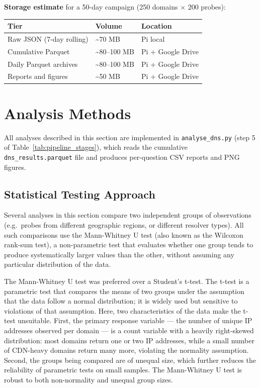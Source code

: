 \textbf{Storage estimate} for a 50-day campaign (250 domains $\times$ 200 probes):

\begin{table}[H]
\centering
\small
\begin{tabular}{l l l}
\toprule
\textbf{Tier} & \textbf{Volume} & \textbf{Location} \\
\midrule
Raw JSON (7-day rolling) & \textasciitilde{}70 MB & Pi local \\
Cumulative Parquet & \textasciitilde{}80--100 MB & Pi + Google Drive \\
Daily Parquet archives & \textasciitilde{}80--100 MB & Pi + Google Drive \\
Reports and figures & \textasciitilde{}50 MB & Pi + Google Drive \\
\bottomrule
\end{tabular}
\end{table}

\bigskip
\section{Analysis Methods}
\label{sec:3.5}

All analyses described in this section are implemented in \texttt{analyse\_dns.py} (step 5 of Table~\ref{tab:pipeline_stages}), which reads the cumulative \texttt{dns\_results.parquet} file and produces per-question CSV reports and PNG figures.

\subsection{Statistical Testing Approach}
\label{subsec:3.5.0}

Several analyses in this section compare two independent groups of observations (e.g.\ probes from different geographic regions, or different resolver types). All such comparisons use the Mann-Whitney U test (also known as the Wilcoxon rank-sum test), a non-parametric test that evaluates whether one group tends to produce systematically larger values than the other, without assuming any particular distribution of the data.

The Mann-Whitney U test was preferred over a Student's t-test. The t-test is a parametric test that compares the means of two groups under the assumption that the data follow a normal distribution; it is widely used but sensitive to violations of that assumption. Here, two characteristics of the data make the t-test unsuitable. First, the primary response variable --- the number of unique \ac{IP} addresses observed per domain --- is a count variable with a heavily right-skewed distribution: most domains return one or two \ac{IP} addresses, while a small number of \ac{CDN}-heavy domains return many more, violating the normality assumption. Second, the groups being compared are of unequal size, which further reduces the reliability of parametric tests on small samples. The Mann-Whitney U test is robust to both non-normality and unequal group sizes.

